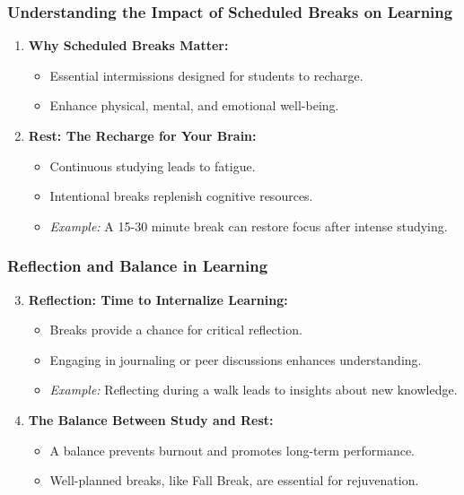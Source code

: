 \documentclass[aspectratio=169]{beamer}
\begin{document}
\begin{frame}[fragile]
    \frametitle{Understanding the Impact of Scheduled Breaks on Learning}
    
    \begin{enumerate}
        \item \textbf{Why Scheduled Breaks Matter:}
        \begin{itemize}
            \item Essential intermissions designed for students to recharge.
            \item Enhance physical, mental, and emotional well-being.
        \end{itemize}

        \item \textbf{Rest: The Recharge for Your Brain:}
        \begin{itemize}
            \item Continuous studying leads to fatigue. 
            \item Intentional breaks replenish cognitive resources.
            \item \textit{Example:} A 15-30 minute break can restore focus after intense studying.
        \end{itemize}
    \end{enumerate}
\end{frame}

\begin{frame}[fragile]
    \frametitle{Reflection and Balance in Learning}
    
    \begin{enumerate}
        \setcounter{enumi}{2} %
        \item \textbf{Reflection: Time to Internalize Learning:}
        \begin{itemize}
            \item Breaks provide a chance for critical reflection.
            \item Engaging in journaling or peer discussions enhances understanding.
            \item \textit{Example:} Reflecting during a walk leads to insights about new knowledge.
        \end{itemize}

        \item \textbf{The Balance Between Study and Rest:}
        \begin{itemize}
            \item A balance prevents burnout and promotes long-term performance.
            \item Well-planned breaks, like Fall Break, are essential for rejuvenation.
        \end{itemize}
    \end{enumerate}
\end{frame}
\end{document}
